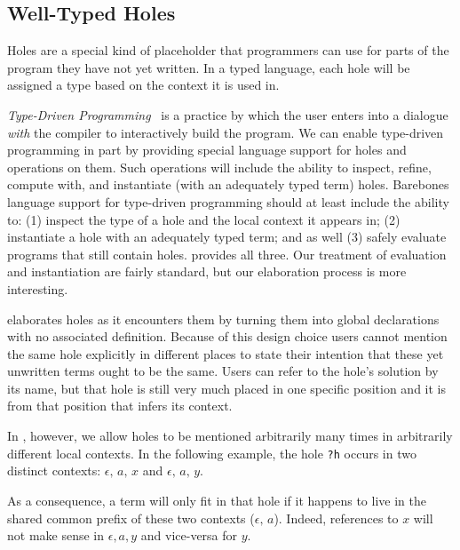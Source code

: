 \subsection{Well-Typed Holes}
\label{sec:design:holes}

Holes are a special kind of placeholder that programmers can use for parts of the program they have not yet written.
%
In a typed language, each hole will be assigned a type based on the context it is used in.

\emph{Type-Driven Programming}~\cite{DBLP:journals/pacmpl/OmarVCH19} is a practice by which the user enters into a dialogue \emph{with} the compiler to interactively build the program.
We can enable type-driven programming in part by providing special language support for holes and operations on them.
Such operations will include the ability to inspect, refine, compute with, and instantiate (with an adequately typed term) holes.
%
Barebones language support for type-driven programming should at least include the ability to:
%
(1) inspect the type of a hole and the local context it appears in;
%
(2) instantiate a hole with an adequately typed term;
%
and as well
%
(3) safely evaluate programs that still contain holes.
%
\Velo{} provides all three.
%
Our treatment of evaluation and instantiation are fairly standard, but our elaboration process is more interesting.

\Idris{} elaborates holes as it encounters them by turning them into
global declarations with no associated definition.
%
Because of this design choice users cannot mention the same hole explicitly in different places to state their intention that these yet unwritten terms ought to be the same.
%
Users can refer to the hole's solution by its name, but that hole is still very much placed in one specific position and it is from that position that \Idris{} infers its context.

In \Velo{}, however, we allow holes to be mentioned arbitrarily many times in
arbitrarily different local contexts.
%
In the following example, the hole \texttt{?h} occurs in two distinct contexts:
$\epsilon,\,a,\,x$ and $\epsilon,\,a,\,y$.

\begin{center}
  \holeexamplegraph{}
\end{center}

As a consequence, a term will only fit in that hole if it happens to live in the shared common prefix of these two contexts ($\epsilon,\,a$).
%
Indeed, references to $x$ will not make sense in $\epsilon,a,y$ and vice-versa for $y$.


